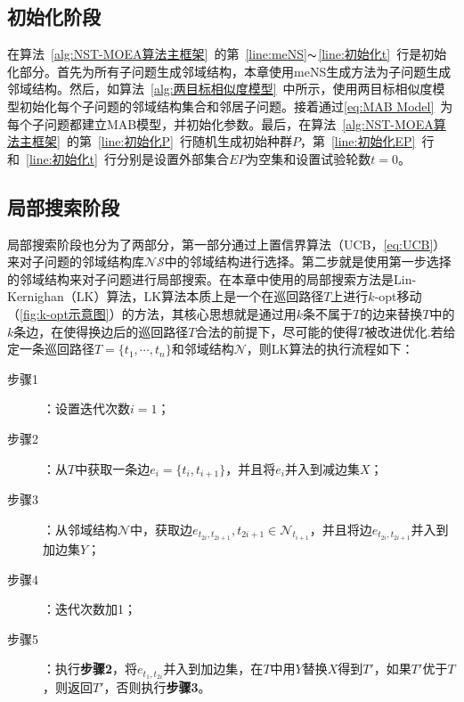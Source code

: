 \subsection{初始化阶段}
\label{subsec:NST:算法设计:初始化阶段}
在算法~\ref{alg:NST-MOEA算法主框架}~的第~\ref{line:meNS}$\thicksim$\ref{line:初始化t}~行是初始化部分。首先为所有子问题生成邻域结构，本章使用meNS生成方法为子问题生成邻域结构。然后，如算法~\ref{alg:两目标相似度模型}~中所示，使用两目标相似度模型初始化每个子问题的邻域结构集合和邻居子问题。接着通过\autoref{eq:MAB Model}~为每个子问题都建立MAB模型，并初始化参数。最后，在算法~\ref{alg:NST-MOEA算法主框架}~的第~\ref{line:初始化P}~行随机生成初始种群$P$，第~\ref{line:初始化EP}~行和~\ref{line:初始化t}~行分别是设置外部集合$EP$为空集和设置试验轮数$t=0$。

\subsection{局部搜索阶段}
\label{subsec:NST:算法设计:局部搜索阶段}
局部搜索阶段也分为了两部分，第一部分通过上置信界算法（UCB，\autoref{eq:UCB}）来对子问题的邻域结构库$\mathcal{NS}$中的邻域结构进行选择。第二步就是使用第一步选择的邻域结构来对子问题进行局部搜索。在本章中使用的局部搜索方法是Lin-Kernighan（LK）算法\cite{lin1973effective}，LK算法本质上是一个在巡回路径$T$上进行$k$-opt移动（\autoref{fig:k-opt示意图}）的方法，其核心思想就是通过用$k$条不属于$T$的边来替换$T$中的$k$条边，在使得换边后的巡回路径$T$合法的前提下，尽可能的使得$T$被改进优化.若给定一条巡回路径$T = \{t_1, \cdots, t_n\}$和邻域结构$\mathcal{N}$，则LK算法的执行流程如下：
\begin{description}
    \item[步骤1]：设置迭代次数$i=1$；
    \item[步骤2]：从$T$中获取一条边$e_i = \{t_i, t_{i+1}\}$，并且将$e_i$并入到减边集$X$；
    \item[步骤3]：从邻域结构$\mathcal{N}$中，获取边$e_{t_{2i}, t_{2i+1}}, t_{2i+1} \in \mathcal{N}_{t_{i+1}}$，并且将边$e_{t_{2i}, t_{2i+1}}$并入到加边集$Y$；
    \item[步骤4]：迭代次数加1；
    \item[步骤5]：执行\textbf{步骤2}，将$e_{t_{1}, t_{2i}}$并入到加边集，在$T$中用$Y$替换$X$得到$T'$，如果$T'$优于$T$，则返回$T'$，否则执行\textbf{步骤3}。
\end{description}

